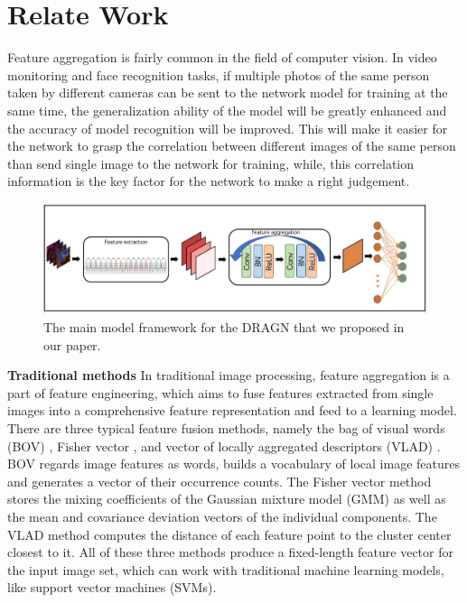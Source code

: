 \documentclass[10pt,twocolumn,letterpaper]{article}
\begin{document}
\section{Relate Work}
Feature aggregation is fairly common in the field of computer vision. In video monitoring and face recognition tasks, if multiple photos of the same person taken by different cameras can be sent to the network model for training at the same time, the generalization ability of the model will be greatly enhanced and the accuracy of model recognition will be improved. This will make it easier for the network to grasp the correlation between different images of the same person than send single image to the network for training, while, this correlation information is the key factor for the network to make a right judgement.

\begin{figure}
\begin{center}
\includegraphics[width=0.8\linewidth]{figure2.JPG}
\end{center}
   \caption{The main model framework for the DRAGN that we proposed in our paper.}
\label{fig:short}
\end{figure}

\textbf{Traditional methods} 
In traditional image processing, feature aggregation is a part of feature engineering, which aims to fuse features extracted from single images into a comprehensive feature representation and feed to a learning model. There are three typical feature fusion methods, namely the bag of visual words (BOV) \cite{bov}, Fisher vector \cite{fishervector}, and vector of locally aggregated descriptors (VLAD) \cite{vlad}. BOV regards image features as words, builds a vocabulary of local image features and generates a vector of their occurrence counts. The Fisher vector method stores the mixing coefficients of the Gaussian mixture model (GMM) as well as the mean and covariance deviation vectors of the individual components. The VLAD method computes the distance of each feature point to the cluster center closest to it. All of these three methods produce a fixed-length feature vector for the input image set, which can work with traditional machine learning models, like support vector machines (SVMs).
\end{document}
